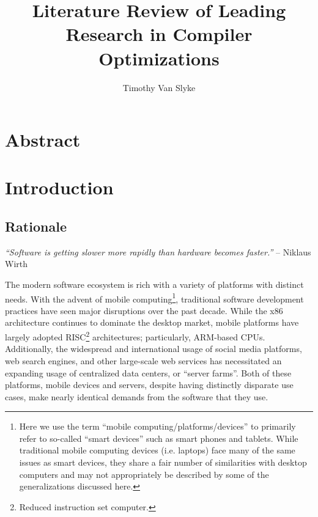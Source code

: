\documentclass[nobib]{tufte-handout}
\title{Literature Review of Leading Research in Compiler Optimizations}
\author{Timothy Van Slyke}
\begin{document}
\maketitle
\section*{Abstract}
\begin{abstract}
\end{abstract}


\section{Introduction}

\subsection{Rationale}
\begin{displayquote}
\textit{``Software is getting slower more rapidly than hardware becomes faster.''}
\newline\noindent\hfill{-- Niklaus Wirth} \\
\end{displayquote}
The modern software ecosystem is rich with a variety of platforms with distinct needs.  With the advent of mobile computing\footnote{Here we use the term ``mobile computing/platforms/devices'' to primarily refer to so-called ``smart devices'' such as smart phones and tablets.  While traditional mobile computing devices (i.e. laptops) face many of the same issues as smart devices, they share a fair number of similarities with desktop computers and may not appropriately be described by some of the generalizations discussed here.}, traditional software development practices have seen major disruptions over the past decade.  While the x86 architecture continues to dominate the desktop market, mobile platforms have largely adopted RISC\footnote{Reduced instruction set computer.} architectures; particularly, ARM-based CPUs.  Additionally, the widespread and international usage of social media platforms, web search engines, and other large-scale web services has necessitated an expanding usage of centralized data centers, or ``server farms''.  Both of these platforms, mobile devices and servers, despite having distinctly disparate use cases, make nearly identical demands from the software that they use.
\end{document}
